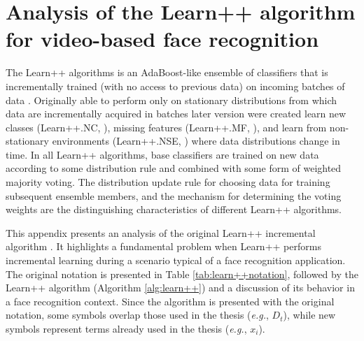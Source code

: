 \chapter{Analysis of the Learn++ algorithm for video-based face recognition}
\label{sec:c0_learn++}

The Learn++ algorithms is an AdaBoost-like ensemble of classifiers that is incrementally trained (with no access to previous data) on incoming batches of data .
Originally able to perform only on stationary distributions from which data are incrementally acquired in batches later version were created learn new classes (Learn++.NC, \cite{muhlbaier09}), missing features (Learn++.MF, \cite{polikar10}), and learn from non-stationary environments (Learn++.NSE, \cite{polikar11}) where data distributions change in time.
In all Learn++ algorithms, base classifiers are trained on new data according to some distribution rule and combined with some form of weighted majority voting.
The distribution update rule for choosing data for training subsequent ensemble members, and the mechanism for determining the voting weights are the distinguishing characteristics of different Learn++ algorithms.

This appendix presents an analysis of the original Learn++ incremental algorithm \cite{polikar01}. 
It highlights a fundamental problem when Learn++ performs incremental learning during a scenario typical of a face recognition application.
The original notation is presented in Table \ref{tab:learn++notation}, followed by the Learn++ algorithm (Algorithm \ref{alg:learn++}) and a discussion of its behavior in a face recognition context.
Since the algorithm is presented with the original notation, some symbols overlap those used in the thesis (\textit{e.g.}, $D_t$), while new symbols represent terms already used in the thesis (\textit{e.g.}, $x_i$).

